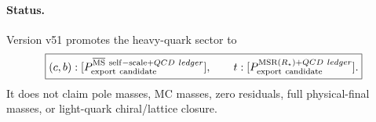 \paragraph{Status.}
Version v51 promotes the heavy-quark sector to
\[
\boxed{
(c,b):[P_{\rm export\ candidate}^{\overline{\rm MS}\ {\rm self-scale}+QCD\ ledger}],
\qquad
 t:[P_{\rm export\ candidate}^{{\rm MSR}(R_\star)+QCD\ ledger}].
}
\]
It does not claim pole masses, MC masses, zero residuals, full physical-final
masses, or light-quark chiral/lattice closure.

